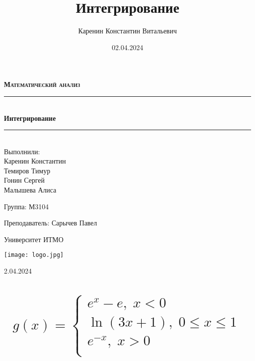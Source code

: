 \documentclass{article}
\title{Интегрирование}
\author{Каренин Константин Витальевич}
\date{02.04.2024}
\begin{document}
\begin{titlepage}
    \centering
    \vspace*{0.5 cm}
    
    \textsc{\LARGE \textbf{Математический анализ}}
    \vspace{1.5cm}
    
    \rule{\linewidth}{0.2 mm} \\[0.4 cm]
    { \huge \bfseries Интегрирование}
    \rule{\linewidth}{0.2 mm} \\[1.5 cm]
    
    \Large Выполнили: \\
    Каренин Константин \\
    Темиров Тимур \\
    Гонин Сергей \\
    Малышева Алиса \\
    
    \vspace{0.5cm}
    
    Группа: М3104
    
    \vspace{0.5cm}
    
    Преподаватель: Сарычев Павел
    
    \vspace{0.5cm}
    
    Университет ИТМО
    
    \vfill

    \texttt{[image: logo.jpg]}
    
    2.04.2024
    
\end{titlepage}

\setcounter{page}{2}

\newpage
    \section{
    \begin{equation*}
    g(x) = 
    \begin{cases}
        e^x-e, \;x < 0 \\
        \ln{(3x+1)}, \;0 \leq x \leq 1 \\
        e^{-x}, \;x > 0 \\
    \end{cases}
    \end{equation*}
    }
\end{document}
